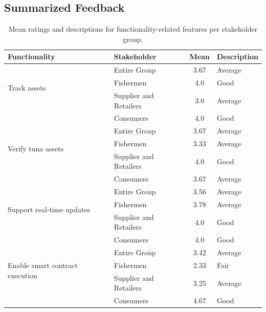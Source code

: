 \subsection{Summarized Feedback}
\begin{table}[H]
	\centering
	\begin{tabular}{|l|l|c|l|}
		\hline
		\textbf{Functionality} & \textbf{Stakeholder} & \textbf{Mean} & \textbf{Description} \\ \hline
		\multirow{3}{*}{Track assets} 
		& Entire Group & 3.67 & Average \\ \cline{2-4}
		& Fishermen & 4.0 & Good \\ \cline{2-4}
		& Supplier and Retailers & 3.0 & Average \\ \cline{2-4}
		& Consumers & 4.0 & Good \\ \hline
		
		\multirow{3}{*}{Verify tuna assets} 
		& Entire Group & 3.67 & Average \\ \cline{2-4}
		& Fishermen & 3.33 & Average \\ \cline{2-4}
		& Supplier and Retailers & 4.0 & Good \\ \cline{2-4}
		& Consumers & 3.67 & Average \\ \hline
		
		\multirow{3}{*}{Support real-time updates} 
		& Entire Group & 3.56 & Average \\ \cline{2-4}
		& Fishermen & 3.78 & Average \\ \cline{2-4}
		& Supplier and Retailers & 4.0 & Good \\ \cline{2-4}
		& Consumers & 4.0 & Good \\ \hline
		
		\multirow{3}{*}{Enable smart contract execution} 
		& Entire Group & 3.42 & Average \\ \cline{2-4}
		& Fishermen & 2.33 & Fair \\ \cline{2-4}
		& Supplier and Retailers & 3.25 & Average \\ \cline{2-4}
		& Consumers & 4.67 & Good \\ \hline
		
	\end{tabular}
	\caption{Mean ratings and descriptions for functionality-related features per stakeholder group.}
	\label{tab:functionality}
\end{table}

